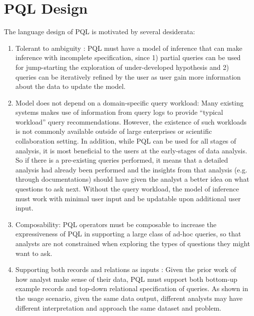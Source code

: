 \documentclass{sig-alternate-05-2015}
\begin{document}
\section{PQL Design}
The language design of PQL is motivated by several desiderata:
\begin{enumerate}
	\item Tolerant to ambiguity : PQL must have a model of inference that can make inference with incomplete specification, since 1) partial queries can be used for jump-starting the exploration of under-developed hypothesis and 2) queries can be iteratively refined by the user as user gain more information about the data to update the model. 
  \item Model does not depend on a domain-specific query workload: Many existing systems makes use of information from query logs to provide ``typical workload'' query recommendations\cite{Morton2014,Kamat2016,Khoussainova2010}. However, the existence of such workloads is not commonly available outside of large enterprises or scientific collaboration setting. In addition, while PQL can be used for all stages of analysis, it is most beneficial to the users at the early-stages of data analysis. So if there is a pre-existing queries performed, it means that a detailed analysis had already been performed and the insights from that analysis (e.g. through documentations) should have given the analyst a better idea on what questions to ask next. Without the query workload, the model of inference must work with minimal user input and be updatable upon additional user input.
	\item Composability: PQL operators must be composable to increase the expressiveness of PQL in supporting a large class of ad-hoc queries, so that analysts are not constrained when exploring the types of questions they might want to ask.
	\item Supporting both records and relations as inputs : Given the prior work of how analyst make sense of their data\cite{Pirolli2005,Klein2006}, PQL must support both bottom-up example records and top-down relational specification of queries. As shown in the usage scenario, given the same data output, different analysts may have different interpretation and approach the same dataset and problem. %

\end{enumerate}
\end{document}
